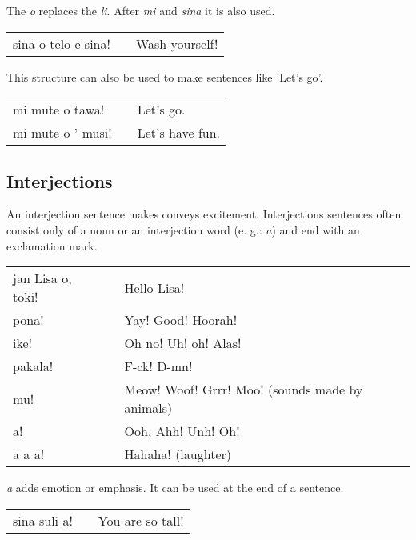 The \textit{o} replaces the \textit{li}. After \textit{mi}  and \textit{sina} it is also used.

\begin{supertabular}{p{5,5cm}|ll}
sina o telo e sina! && Wash yourself! \\
\end{supertabular} 

This structure can also be used to make sentences like 'Let's go'.

\begin{supertabular}{p{5,5cm}|ll}
mi mute o tawa! && Let's go. \\
mi mute o ' musi! && Let's have fun. \\
\end{supertabular} 
%
{}
\subsection*{Interjections}
%
An interjection sentence makes conveys excitement.
Interjections sentences often consist only of a noun or an interjection word (e. g.: \textit{a}) and end with an exclamation mark.

\begin{supertabular}{p{5,5cm}|ll}
jan Lisa o, toki! && Hello Lisa! \\
pona! && Yay! Good! Hoorah! \\
ike! && Oh no! Uh! oh! Alas! \\
pakala! && F-ck! D-mn! \\
mu! && Meow! Woof! Grrr! Moo! (sounds made by animals) \\
a! && Ooh, Ahh! Unh! Oh! \\
a a a! && Hahaha! (laughter) \\
\end{supertabular} 

\textit{a} adds emotion or emphasis. It can be used at the end of a sentence.

\begin{supertabular}{p{5,5cm}|ll}
sina suli a! && You are so tall! \\
\end{supertabular} 

